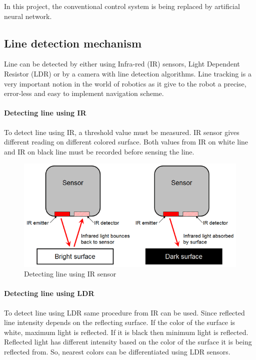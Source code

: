 \documentclass[14pt,a4paper]{extarticle}
\begin{document}
In this project, the conventional control system is being replaced by artificial neural network. 

	\subsection{Line detection mechanism}
	Line can be detected by either using Infra-red (IR) sensors, Light Dependent Resistor (LDR) or by a camera with line detection algorithms. Line tracking is a very important notion in the world of robotics as it give to the robot a precise, error-less and easy to implement navigation scheme. 
	
		\paragraph{Detecting line using IR}
		To detect line using IR, a threshold value must be measured. IR sensor gives different reading on different colored surface. Both values from IR on white line and IR on black line must be recorded before sensing the line.
		
		
		\begin{figure}[!h]
				\includegraphics[width=\textwidth]{ir_line.png}
				\caption{Detecting line using IR sensor}
				\label{fig:detect_line_ir}
		\end{figure}
		
		\paragraph{Detecting line using LDR}
		To detect line using LDR same procedure from IR can be used. Since reflected line intensity depends on the reflecting surface. If the color of the surface is white, maximum light is reflected. If it is black then minimum light is reflected. Reflected light has different intensity based on the color of the surface it is being reflected from. So, nearest colors can be differentiated using LDR sensors. 
		
\end{document}
